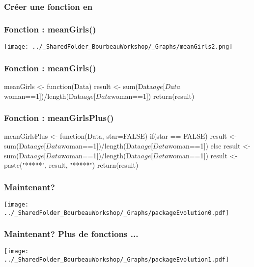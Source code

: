 \documentclass{beamer}
\begin{document}
    \begin{frame}[fragile=singleslide]
        \frametitle{Créer une fonction en \R}
    \end{frame}
    
    \begin{frame}
        \frametitle{Fonction \R : meanGirls()} \vspace{1cm}
        \begin{center}
            \texttt{[image: ../\_SharedFolder\_BourbeauWorkshop/\_Graphs/meanGirls2.png]}
        \end{center}
    \end{frame}
    
    \begin{frame}[fragile=singleslide]
        \frametitle{Fonction \R: meanGirls()}
        \begin{code}
meanGirls <- function(Data){
    result <- sum(Data$age[Data$woman==1])/length(Data$age[Data$woman==1])
    return(result)
}
        \end{code}
    \end{frame}


    \begin{frame}[fragile=singleslide]
        \frametitle{Fonction \R : meanGirlsPlus()}
        \begin{code}
meanGirlsPlus <- function(Data, star=FALSE){
    if(star == FALSE){
        result <- sum(Data$age[Data$woman==1])/length(Data$age[Data$woman==1])
    } else {
        result <- sum(Data$age[Data$woman==1])/length(Data$age[Data$woman==1])
        result <- paste("*****", result, "*****")
    }    
    return(result)
}
        \end{code}
    \end{frame}
    
    \begin{frame}
        \frametitle{Maintenant?} \vspace{1cm}
        \begin{center}
            \texttt{[image: ../\_SharedFolder\_BourbeauWorkshop/\_Graphs/packageEvolution0.pdf]}
        \end{center}
    \end{frame} 
    
    \begin{frame}
        \frametitle{Maintenant? Plus de fonctions \R ...} \vspace{1cm}
        \begin{center}
            \texttt{[image: ../\_SharedFolder\_BourbeauWorkshop/\_Graphs/packageEvolution1.pdf]}
        \end{center}
    \end{frame} 
    
\end{document}
